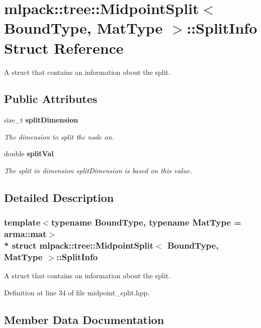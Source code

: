 \section{mlpack\+:\+:tree\+:\+:Midpoint\+Split$<$ Bound\+Type, Mat\+Type $>$\+:\+:Split\+Info Struct Reference}
\label{structmlpack_1_1tree_1_1MidpointSplit_1_1SplitInfo}


A struct that contains an information about the split.  


\subsection*{Public Attributes}
\begin{DoxyCompactItemize}
\item 
size\+\_\+t {\bf split\+Dimension}
\begin{DoxyCompactList}\small\item\em The dimension to split the node on. \end{DoxyCompactList}\item 
double {\bf split\+Val}
\begin{DoxyCompactList}\small\item\em The split in dimension split\+Dimension is based on this value. \end{DoxyCompactList}\end{DoxyCompactItemize}


\subsection{Detailed Description}
\subsubsection*{template$<$typename Bound\+Type, typename Mat\+Type = arma\+::mat$>$\\*
struct mlpack\+::tree\+::\+Midpoint\+Split$<$ Bound\+Type, Mat\+Type $>$\+::\+Split\+Info}

A struct that contains an information about the split. 

Definition at line 34 of file midpoint\+\_\+split.\+hpp.



\subsection{Member Data Documentation}
